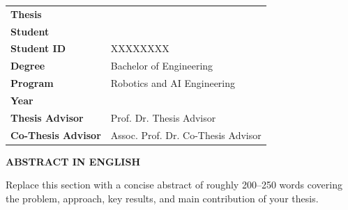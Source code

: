 \newcommand{\abstractmetadata}{
\noindent
\begin{tabularx}{\textwidth}{@{}>{\bfseries}l X@{}}
Thesis & \thesistitle \\
Student & \studentname \\
Student ID & XXXXXXXX \\
Degree & Bachelor of Engineering \\
Program & Robotics and AI Engineering \\
Year & \thesisyear \\
Thesis Advisor & Prof. Dr. Thesis Advisor \\
Co-Thesis Advisor & Assoc. Prof. Dr. Co-Thesis Advisor \\
\end{tabularx}
}

\newcommand{\abstractheading}[1]{
\vspace{1cm}
\begin{center}
{\fontsize{18pt}{22pt}\selectfont\bfseries #1}
\end{center}
}

\abstractmetadata
\abstractheading{ABSTRACT IN ENGLISH}

Replace this section with a concise abstract of roughly 200--250 words covering the problem, approach, key results, and main contribution of your thesis.
